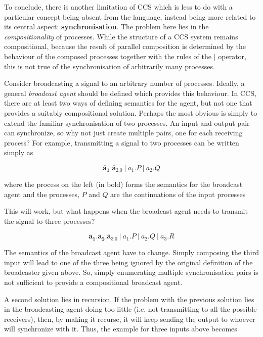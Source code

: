 To conclude, there is another limitation of CCS which is less to do
with a particular concept being absent from the language, instead
being more related to its central aspect: \textbf{synchronisation}.
The problem here lies in the \emph{compositionality} of processes.
While the structure of a CCS system remains compositional, because the
result of parallel composition is determined by the behaviour of the
composed processes together with the rules of the $|$ operator, this
is not true of the synchronisation of arbitrarily many processes.

Consider broadcasting a signal to an arbitrary number of processes.
Ideally, a general \emph{broadcast agent} should be defined which
provides this behaviour.  In CCS, there are at least two ways of
defining semantics for the agent, but not one that provides a suitably
compositional solution.  Perhaps the most obvious is simply to extend
the familiar synchronisation of two processes.  An input and output
pair can synchronize, so why not just create multiple pairs, one for
each receiving process?  For example, transmitting a signal to two
processes can be written simply as

\begin{equation}
\mathbf{\overline{a}_1.\overline{a}_2.0}\ |\ a_1.P\ |\ a_2.Q
\end{equation}

\noindent where the process on the left (in bold) forms the semantics
for the broadcast agent and the processes, $P$ and $Q$ are the
continuations of the input processes

This will work, but what happens when the broadcast agent needs to
transmit the signal to three processes?

\begin{equation}
\mathbf{\overline{a}_1.\overline{a}_2.\overline{a}_3.0}\ |\ a_1.P\ |\ a_2.Q\ |\ a_3.R
\end{equation}

\noindent The semantics of the broadcast agent have to change.  Simply
composing the third input will lead to one of the three being ignored
by the original definition of the broadcaster given above.  So, simply
enumerating multiple synchronisation pairs is not sufficient to
provide a compositional broadcast agent.

A second solution lies in recursion.  If the problem with the previous
solution lies in the broadcasting agent doing too little (i.e. not
transmitting to all the possible receivers), then, by making it
recurse, it will keep sending the output to whoever will synchronize
with it.  Thus, the example for three inputs above becomes

